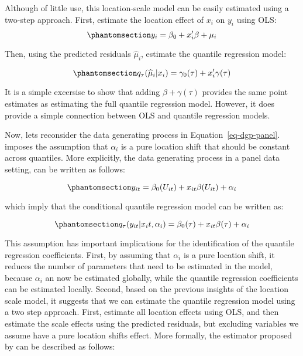 \documentclass[bib]{statapress}
\begin{document}
Although of little use, this location-scale model can be easily
estimated using a two-step approach. First, estimate the location effect
of \(x_i\) on \(y_i\) using OLS:
\begin{equation}\phantomsection\label{eq-ls-1}{y_i = \beta_0+x_i'\beta + \mu_i
}\end{equation}

Then, using the predicted residuals \(\hat \mu_i\), estimate the
quantile regression model:

\begin{equation}\phantomsection\label{eq-ls-2}{q_\tau(\hat \mu_i|x_i)=\gamma_0(\tau)+ x_i'\gamma(\tau)
}\end{equation}

It is a simple excersise to show that adding \(\beta+\gamma(\tau)\)
provides the same point estimates as estimating the full quantile
regression model. However, it does provide a simple connection between
OLS and quantile regression models.

Now, lets reconsider the data generating process in
Equation~\ref{eq-dgp-panel}. \citet{canay2011} imposes the assumption
that \(\alpha_i\) is a pure location shift that should be constant
across quantiles. More explicitly, the data generating process in a
panel data setting, can be written as follows:

\begin{equation}\phantomsection\label{eq-canay-dgp}{y_{it} = \beta_0(U_{it}) + x_{it}\beta(U_{it}) + \alpha_i
}\end{equation}

which imply that the conditional quantile regression model can be
written as:

\begin{equation}\phantomsection\label{eq-canay-qreg}{q_\tau(y_{it}|x_it,\alpha_i) = \beta_0(\tau) + x_{it}\beta(\tau) + \alpha_i
}\end{equation}

This assumption has important implications for the identification of the
quantile regression coefficients. First, by assuming that \(\alpha_i\)
is a pure location shift, it reduces the number of parameters that need
to be estimated in the model, because \(\alpha_i\) an now be estimated
globally, while the quantile regression coefficients can be estimated
locally. Second, based on the previous insights of the location scale
model, it suggests that we can estimate the quantile regression model
using a two step approach. First, estimate all location effects using
OLS, and then estimate the scale effects using the predicted residuals,
but excluding variables we assume have a pure location shifts effect.
More formally, the estimator proposed by \citet{canay2011} can be
described as follows:
\end{document}
